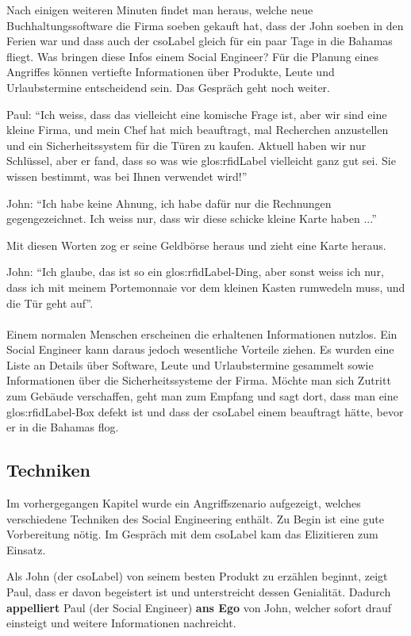 Nach einigen weiteren Minuten findet man heraus, welche neue Buchhaltungssoftware die Firma soeben gekauft hat, dass der John soeben in den Ferien war und dass auch der \Gls{csoLabel} gleich für ein paar Tage in die Bahamas fliegt. Was bringen diese Infos einem Social Engineer? Für die Planung eines Angriffes können vertiefte Informationen über Produkte, Leute und Urlaubstermine entscheidend sein. Das Gespräch geht noch weiter.

Paul: "`Ich weiss, dass das vielleicht eine komische Frage ist, aber wir sind eine kleine Firma, und mein Chef hat mich beauftragt, mal Recherchen anzustellen und ein Sicherheitssystem für die Türen zu kaufen. Aktuell haben wir nur Schlüssel, aber er fand, dass so was wie \gls{glos:rfidLabel} vielleicht ganz gut sei. Sie wissen bestimmt, was bei Ihnen verwendet wird!"'

John: "`Ich habe keine Ahnung, ich habe dafür nur die Rechnungen gegengezeichnet. Ich weiss nur, dass wir diese schicke kleine Karte haben ..."'

Mit diesen Worten zog er seine Geldbörse heraus und zieht eine Karte heraus.

John: "`Ich glaube, das ist so ein \gls{glos:rfidLabel}-Ding, aber sonst weiss ich nur, dass ich mit meinem Portemonnaie vor dem kleinen Kasten rumwedeln muss, und die Tür geht auf"'.
\\
\\
Einem normalen Menschen erscheinen die erhaltenen Informationen nutzlos. Ein Social Engineer kann daraus jedoch wesentliche Vorteile ziehen. Es wurden eine Liste an Details über Software, Leute und Urlaubstermine gesammelt sowie Informationen über die Sicherheitssysteme der Firma.
Möchte man sich Zutritt zum Gebäude verschaffen, geht man zum Empfang und sagt dort, dass man eine \gls{glos:rfidLabel}-Box defekt ist und dass der \Gls{csoLabel} einem beauftragt hätte, bevor er in die Bahamas flog.

\subsection{Techniken}
\label{sec:Elizitieren:techniken}
Im vorhergegangen Kapitel wurde ein Angriffszenario aufgezeigt, welches verschiedene Techniken des Social Engineering enthält. Zu Begin ist eine gute Vorbereitung nötig. Im Gespräch mit dem \Gls{csoLabel} kam das Elizitieren zum Einsatz. 

Als John (der \Gls{csoLabel}) von seinem besten Produkt zu erzählen beginnt, zeigt Paul, dass er davon begeistert ist und unterstreicht dessen Genialität. Dadurch \textbf{appelliert} Paul (der Social Engineer) \textbf{ans Ego} von John, welcher sofort drauf einsteigt und weitere Informationen nachreicht.

